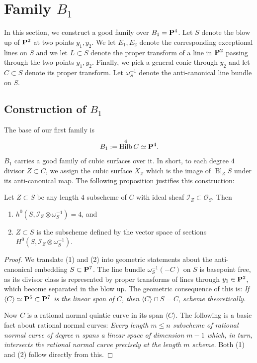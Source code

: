 \documentclass[12pt,reqno]{amsart}
\DeclareMathOperator{\Bl}{Bl}
\DeclareMathOperator{\Hilb}{Hilb}
\numberwithin{equation}{section}
\begin{document}
\section{Family $B_1$}
\label{sec:first-test-family}

In this section, we construct a good family over $B_{1} = \P^{4}$.
Let $S$ denote the blow up of $\P^{2}$ at two points $y_1,y_2$. We let
$E_{1}, E_{2}$ denote the corresponding exceptional lines on $S$ and
we let $L \subset S$ denote the proper transform of a line in $\P^2$
passing through the two points $y_1,y_2$. Finally, we pick a general
conic through $y_{2}$ and let $C \subset S$ denote its proper
transform. Let $\omega_{S}^{-1}$ denote the anti-canonical line bundle
on $S$.  

\subsection{Construction of $B_1$}
\label{sec:construction-b_1}


The base of our first family is
\begin{align}
  \label{eq:B1}
  B_1 := \Hilb^{4}C \simeq \P^{4}.
\end{align}
$B_1$ carries a good family of cubic surfaces over it.  In short, to
each degree $4$ divisor $Z \subset C$, we assign the cubic surface
$X_{Z}$ which is the image of $\Bl_{Z}S$ under its anti-canonical
map. The following proposition justifies this construction:

\begin{proposition}
  \label{prop:B1} Let $Z \subset S$ be any length $4$ subscheme of $C$
  with ideal sheaf $\mathcal{I}_{Z} \subset \mathcal{O}_{S}$. Then
  \begin{enumerate}
  \item $h^{0}(S, \mathcal{I}_{Z} \otimes \omega_{S}^{-1}) = 4$, and
  \item $Z \subset S$ is the subscheme defined by the vector space of
    sections $H^{0}(S, \mathcal{I}_{Z} \otimes \omega_{S}^{-1})$.
  \end{enumerate}
\end{proposition}

\begin{proof}
  We translate (1) and (2) into geometric statements about the
  anti-canonical embedding $S \subset \P^{7}$.  The line bundle
  $\omega_{S}^{-1}(-C)$ on $S$ is basepoint free, as its divisor class
  is represented by proper transforms of lines through
  $y_{1} \in \P^2$, which become separated in the blow up.  The
  geometric consequence of this is: {\sl If
    $\langle C \rangle \simeq \P^5 \subset \P^7$ is the linear span of
    $C$, then $\langle C \rangle \cap S = C$, scheme theoretically.}

  Now $C$ is a rational normal quintic curve in its span
  $\langle C \rangle$. The following is a basic fact about rational
  normal curves: {\sl Every length $m \leq n$ subscheme of rational
    normal curve of degree $n$ spans a linear space of dimension $m-1$
    which, in turn, intersects the rational normal curve precisely at
    the length $m$ scheme.}  Both (1) and (2) follow directly from
  this.
\end{proof}
\end{document}
